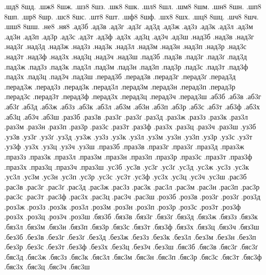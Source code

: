 {.шд8
8шд.
.шж8
8шж.
.шз8
8шз.
.шк8
8шк.
.шл8
8шл.
.шм8
8шм.
.шн8
8шн.
.шп8
8шп.
.шр8
8шр.
.шс8
8шс.
.шт8
8шт.
.шф8
8шф.
.шх8
8шх.
.шц8
8шц.
.шч8
8шч.
.шш8
8шш.
.не8
.ня8
.ад3б
.ад3в
.ад3г
.ад3ґ
.ад3д
.ад3ж
.ад3з
.ад3к
.ад3л
.ад3м
.ад3н
.ад3п
.ад3р
.ад3с
.ад3т
.ад3ф
.ад3х
.ад3ц
.ад3ч
.ад3ш
.над3б
.над3в
.над3г
.над3ґ
.над3д
.над3ж
.над3з
.над3к
.над3л
.над3м
.над3н
.над3п
.над3р
.над3с
.над3т
.над3ф
.над3х
.над3ц
.над3ч
.над3ш
.пад3б
.пад3в
.пад3г
.пад3ґ
.пад3д
.пад3ж
.пад3з
.пад3к
.пад3л
.пад3м
.пад3н
.пад3п
.пад3р
.пад3с
.пад3т
.пад3ф
.пад3х
.пад3ц
.пад3ч
.пад3ш
.перад3б
.перад3в
.перад3г
.перад3ґ
.перад3д
.перад3ж
.перад3з
.перад3к
.перад3л
.перад3м
.перад3н
.перад3п
.перад3р
.перад3с
.перад3т
.перад3ф
.перад3х
.перад3ц
.перад3ч
.перад3ш
.аб3б
.аб3в
.аб3г
.аб3ґ
.аб3д
.аб3ж
.аб3з
.аб3к
.аб3л
.аб3м
.аб3н
.аб3п
.аб3р
.аб3с
.аб3т
.аб3ф
.аб3х
.аб3ц
.аб3ч
.аб3ш
.раз3б
.раз3в
.раз3г
.раз3ґ
.раз3д
.раз3ж
.раз3з
.раз3к
.раз3л
.раз3м
.раз3н
.раз3п
.раз3р
.раз3с
.раз3т
.раз3ф
.раз3х
.раз3ц
.раз3ч
.раз3ш
.уз3б
.уз3в
.уз3г
.уз3ґ
.уз3д
.уз3ж
.уз3з
.уз3к
.уз3л
.уз3м
.уз3н
.уз3п
.уз3р
.уз3с
.уз3т
.уз3ф
.уз3х
.уз3ц
.уз3ч
.уз3ш
.праз3б
.праз3в
.праз3г
.праз3ґ
.праз3д
.праз3ж
.праз3з
.праз3к
.праз3л
.праз3м
.праз3н
.праз3п
.праз3р
.праз3с
.праз3т
.праз3ф
.праз3х
.праз3ц
.праз3ч
.праз3ш
.ус3б
.ус3в
.ус3г
.ус3ґ
.ус3д
.ус3ж
.ус3з
.ус3к
.ус3л
.ус3м
.ус3н
.ус3п
.ус3р
.ус3с
.ус3т
.ус3ф
.ус3х
.ус3ц
.ус3ч
.ус3ш
.рас3б
.рас3в
.рас3г
.рас3ґ
.рас3д
.рас3ж
.рас3з
.рас3к
.рас3л
.рас3м
.рас3н
.рас3п
.рас3р
.рас3с
.рас3т
.рас3ф
.рас3х
.рас3ц
.рас3ч
.рас3ш
.роз3б
.роз3в
.роз3г
.роз3ґ
.роз3д
.роз3ж
.роз3з
.роз3к
.роз3л
.роз3м
.роз3н
.роз3п
.роз3р
.роз3с
.роз3т
.роз3ф
.роз3х
.роз3ц
.роз3ч
.роз3ш
.бяз3б
.бяз3в
.бяз3г
.бяз3ґ
.бяз3д
.бяз3ж
.бяз3з
.бяз3к
.бяз3л
.бяз3м
.бяз3н
.бяз3п
.бяз3р
.бяз3с
.бяз3т
.бяз3ф
.бяз3х
.бяз3ц
.бяз3ч
.бяз3ш
.без3б
.без3в
.без3г
.без3ґ
.без3д
.без3ж
.без3з
.без3к
.без3л
.без3м
.без3н
.без3п
.без3р
.без3с
.без3т
.без3ф
.без3х
.без3ц
.без3ч
.без3ш
.бяс3б
.бяс3в
.бяс3г
.бяс3ґ
.бяс3д
.бяс3ж
.бяс3з
.бяс3к
.бяс3л
.бяс3м
.бяс3н
.бяс3п
.бяс3р
.бяс3с
.бяс3т
.бяс3ф
.бяс3х
.бяс3ц
.бяс3ч
.бяс3ш
}
